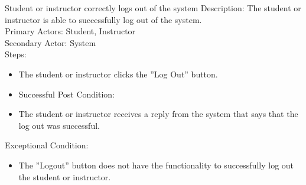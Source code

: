     \begin{section}{Student or instructor correctly logs out of the system}
        Description: The student or instructor is able to successfully log out of the system.\\
        Primary Actors: Student, Instructor\\
        Secondary Actor: System\\
        Steps:
        \begin{itemize}
            \item The student or instructor clicks the ''Log Out'' button.
            \item Successful Post Condition:
            \item The student or instructor receives a reply from the system that says that the log out was successful.
        \end{itemize}
        Exceptional Condition:
        \begin{itemize}
            \item The ''Logout'' button does not have the functionality to successfully log out the student or instructor.
        \end{itemize}


    \end{section}







